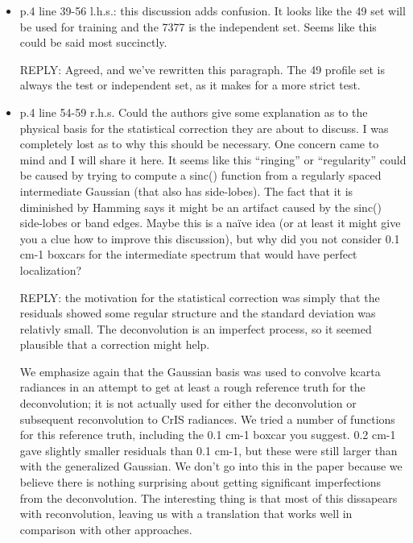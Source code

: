 \documentclass[11pt]{article}
\newcommand {\reply} {\mbox{\small REPLY}}
\begin{document}
\begin{itemize}
\item p.4 line 39-56 l.h.s.: this discussion adds confusion. It
  looks like the 49 set will be used for training and the 7377 is
  the independent set. Seems like this could be said most
  succinctly.

  \reply: Agreed, and we've rewritten this paragraph.  The 49
  profile set is always the test or independent set, as it makes for
  a more strict test.

\item p.4 line 54-59 r.h.s. Could the authors give some explanation
  as to the physical basis for the statistical correction they are
  about to discuss. I was completely lost as to why this should be
  necessary. One concern came to mind and I will share it here. It
  seems like this ``ringing'' or ``regularity'' could be caused by
  trying to compute a sinc() function from a regularly spaced
  intermediate Gaussian (that also has side-lobes). The fact that it
  is diminished by Hamming says it might be an artifact caused by
  the sinc() side-lobes or band edges. Maybe this is a naïve idea
  (or at least it might give you a clue how to improve this
  discussion), but why did you not consider 0.1 cm-1 boxcars for the
  intermediate spectrum that would have perfect localization?

  \reply: the motivation for the statistical correction was simply
  that the residuals showed some regular structure and the standard
  deviation was relativly small.  The deconvolution is an imperfect
  process, so it seemed plausible that a correction might help.

  We emphasize again that the Gaussian basis was used to convolve
  kcarta radiances in an attempt to get at least a rough reference
  truth for the deconvolution; it is not actually used for either
  the deconvolution or subsequent reconvolution to CrIS radiances.
  We tried a number of functions for this reference truth, including
  the 0.1 cm-1 boxcar you suggest.  0.2 cm-1 gave slightly smaller
  residuals than 0.1 cm-1, but these were still larger than with the
  generalized Gaussian.  We don't go into this in the paper because
  we believe there is nothing surprising about getting significant
  imperfections from the deconvolution.  The interesting thing is
  that most of this dissapears with reconvolution, leaving us with a
  translation that works well in comparison with other approaches.
  

\end{itemize}
\end{document}
